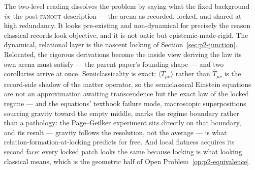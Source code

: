 \documentclass[11pt,a4paper]{article}
\newcommand{\fanout}{\textsc{fanout}}
\begin{document}
The two-level reading dissolves the problem by saying what the fixed background \emph{is}: the
post-\fanout{} description --- the arena as recorded, locked, and shared at high redundancy. It
looks pre-existing and non-dynamical for precisely the reason classical records look objective,
and it is not ontic but epistemic-made-rigid. The dynamical, relational layer is the nascent
locking of Section~\ref{sec:p2-junction}. Relocated, the rigorous derivations become the inside
view deriving the law its own arena must satisfy --- the parent paper's founding shape --- and two
corollaries arrive at once. Semiclassicality is exact: $\langle T_{\mu\nu}\rangle$ rather than
$\hat{T}_{\mu\nu}$ is the record-side shadow of the matter operator, so the semiclassical Einstein
equations are not an approximation awaiting transcendence but the exact law of the locked regime
--- and the equations' textbook failure mode, macroscopic superpositions sourcing gravity toward
the empty middle, marks the regime boundary rather than a pathology: the Page--Geilker experiment
\autocite{pagegeilker1981} sits directly on that boundary, and its result --- gravity follows the
resolution, not the average --- is what relation-formation-at-locking predicts for free. And local
flatness acquires its second face: every locked patch looks the same because locking is what
looking classical means, which is the geometric half of Open Problem~\ref{op:p2-equivalence}.


\end{document}
